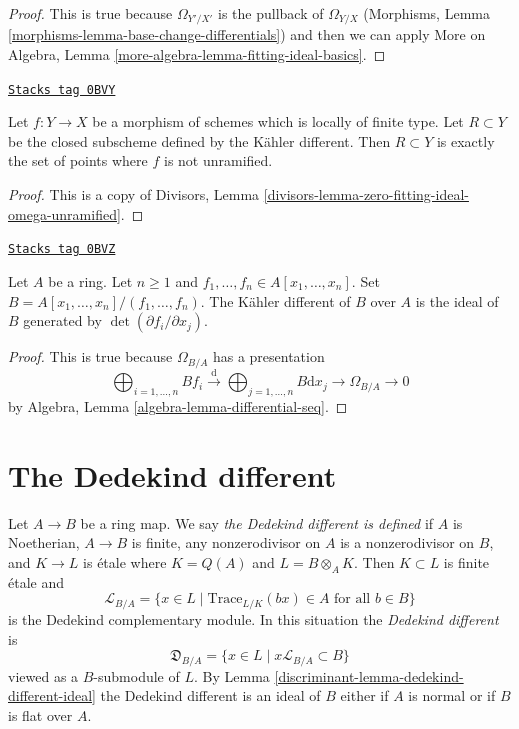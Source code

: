 \begin{proof}
This is true because $\Omega_{Y'/X'}$ is the pullback of $\Omega_{Y/X}$
(Morphisms, Lemma \ref{morphisms-lemma-base-change-differentials})
and then we can apply
More on Algebra, Lemma \ref{more-algebra-lemma-fitting-ideal-basics}.
\end{proof}

\begin{lemma}
\label{discriminant-lemma-kahler-different}
\href{https://stacks.math.columbia.edu/tag/0BVY}{\texttt{Stacks tag 0BVY}}

Let $f : Y \to X$ be a morphism of schemes which is locally of finite type.
Let $R \subset Y$ be the closed subscheme defined by
the K\"ahler different. Then $R \subset Y$ is exactly
the set of points where $f$ is not unramified.
\end{lemma}

\begin{proof}
This is a copy of
Divisors, Lemma \ref{divisors-lemma-zero-fitting-ideal-omega-unramified}.
\end{proof}

\begin{lemma}
\label{discriminant-lemma-kahler-different-complete-intersection}
\href{https://stacks.math.columbia.edu/tag/0BVZ}{\texttt{Stacks tag 0BVZ}}

Let $A$ be a ring. Let $n \geq 1$ and
$f_1, \ldots, f_n \in A[x_1, \ldots, x_n]$.
Set $B = A[x_1, \ldots, x_n]/(f_1, \ldots, f_n)$.
The K\"ahler different of $B$ over $A$ is the ideal
of $B$ generated by $\det(\partial f_i/\partial x_j)$.
\end{lemma}

\begin{proof}
This is true because $\Omega_{B/A}$ has a presentation
$$
\bigoplus\nolimits_{i = 1, \ldots, n} B f_i
\xrightarrow{\text{d}}
\bigoplus\nolimits_{j = 1, \ldots, n} B \text{d}x_j
\rightarrow \Omega_{B/A} \rightarrow 0
$$
by Algebra, Lemma \ref{algebra-lemma-differential-seq}.
\end{proof}

\section{The Dedekind different}
\label{discriminant-section-dedekind-different}
Let $A \to B$ be a ring map. We say {\it the Dedekind different is defined}
if $A$ is Noetherian, $A \to B$ is finite,
any nonzerodivisor on $A$ is a nonzerodivisor on $B$, and $K \to L$ is
\'etale where $K = Q(A)$ and $L = B \otimes_A K$. Then $K \subset L$ is
finite \'etale and
$$
\mathcal{L}_{B/A} = \{x \in L \mid \text{Trace}_{L/K}(bx) \in A
\text{ for all }b \in B\}
$$
is the Dedekind complementary module. In this situation the
{\it Dedekind different} is
$$
\mathfrak{D}_{B/A} = \{x \in L \mid x\mathcal{L}_{B/A} \subset B\}
$$
viewed as a $B$-submodule of $L$.
By Lemma \ref{discriminant-lemma-dedekind-different-ideal} the Dedekind different is an
ideal of $B$ either if $A$ is normal or if $B$ is flat over $A$.

